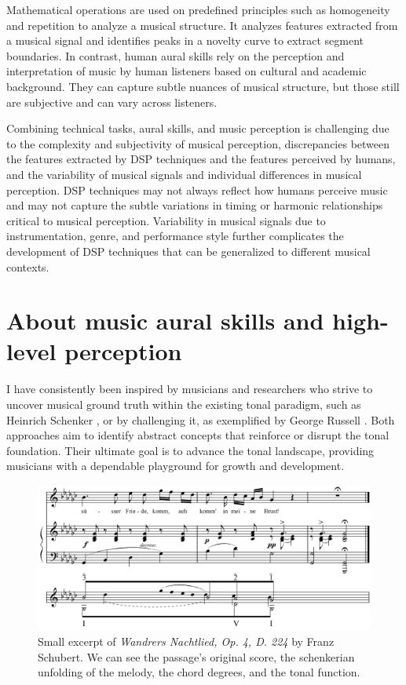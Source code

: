 

Mathematical operations are used on predefined principles such as homogeneity and repetition to analyze a musical structure. It analyzes features extracted from a musical signal and identifies peaks in a novelty curve to extract segment boundaries. In contrast, human aural skills rely on the perception and interpretation of music by human listeners based on cultural and academic background. They can capture subtle nuances of musical structure, but those still are subjective and can vary across listeners.

Combining technical tasks, aural skills, and music perception is challenging due to the complexity and subjectivity of musical perception, discrepancies between the features extracted by DSP techniques and the features perceived by humans, and the variability of musical signals and individual differences in musical perception. DSP techniques may not always reflect how humans perceive music and may not capture the subtle variations in timing or harmonic relationships critical to musical perception. Variability in musical signals due to instrumentation, genre, and performance style further complicates the development of DSP techniques that can be generalized to different musical contexts.

\section{About music aural skills and high-level perception}

I have consistently been inspired by musicians and researchers who strive to uncover musical ground truth within the existing tonal paradigm, such as Heinrich Schenker \cite{}, or by challenging it, as exemplified by George Russell \cite{LydianRussell}. Both approaches aim to identify abstract concepts that reinforce or disrupt the tonal foundation. Their ultimate goal is to advance the tonal landscape, providing musicians with a dependable playground for growth and development.


\begin{figure}[h]
\includegraphics[clip,width=\columnwidth]{figures/schenkerian analysis/SchubertOp4no3.png}%
\caption{Small excerpt of \textit{Wandrers Nachtlied, Op. 4, D. 224} by Franz Schubert. We can see the passage's original score, the schenkerian unfolding of the melody, the chord degrees, and the tonal function.}
\label{fig:Wandrers Nachtlied, Op. 4, D. 224}
\end{figure}

